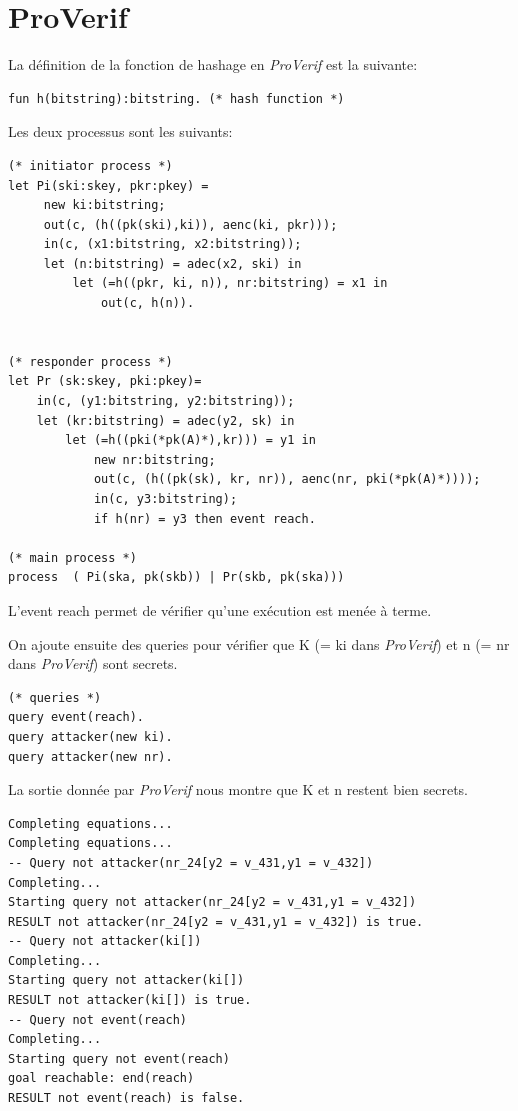 \documentclass[10pt,a4paper]{article}
\begin{document}
\section{ProVerif}
La définition de la fonction de hashage en \textit{ProVerif} est la suivante:
\begin{Verbatim}[fontsize=\scriptsize]
fun h(bitstring):bitstring. (* hash function *)
\end{Verbatim}

Les deux processus sont les suivants:

\begin{Verbatim}[fontsize=\scriptsize]
(* initiator process *)
let Pi(ski:skey, pkr:pkey) = 
	 new ki:bitstring; 
	 out(c, (h((pk(ski),ki)), aenc(ki, pkr)));
	 in(c, (x1:bitstring, x2:bitstring));
	 let (n:bitstring) = adec(x2, ski) in
		 let (=h((pkr, ki, n)), nr:bitstring) = x1 in
			 out(c, h(n)).
	 

(* responder process *)
let Pr (sk:skey, pki:pkey)=
	in(c, (y1:bitstring, y2:bitstring));
	let (kr:bitstring) = adec(y2, sk) in
		let (=h((pki(*pk(A)*),kr))) = y1 in
			new nr:bitstring; 
			out(c, (h((pk(sk), kr, nr)), aenc(nr, pki(*pk(A)*))));
			in(c, y3:bitstring);
			if h(nr) = y3 then event reach.
			
(* main process *)
process  ( Pi(ska, pk(skb)) | Pr(skb, pk(ska)))
\end{Verbatim}


L'event reach permet de vérifier qu'une exécution est menée à terme.

On ajoute ensuite des queries pour vérifier que K (= ki dans \textit{ProVerif}) et n (= nr dans \textit{ProVerif}) sont secrets.

\begin{Verbatim}[fontsize=\scriptsize]
(* queries *)
query event(reach).
query attacker(new ki).
query attacker(new nr).
\end{Verbatim}

La sortie donnée par \textit{ProVerif} nous montre que K et n restent bien secrets.

\begin{Verbatim}[fontsize=\scriptsize]
Completing equations...
Completing equations...
-- Query not attacker(nr_24[y2 = v_431,y1 = v_432])
Completing...
Starting query not attacker(nr_24[y2 = v_431,y1 = v_432])
RESULT not attacker(nr_24[y2 = v_431,y1 = v_432]) is true.
-- Query not attacker(ki[])
Completing...
Starting query not attacker(ki[])
RESULT not attacker(ki[]) is true.
-- Query not event(reach)
Completing...
Starting query not event(reach)
goal reachable: end(reach)
RESULT not event(reach) is false.
\end{Verbatim}
\end{document}

